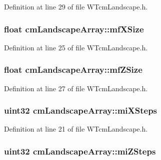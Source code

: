 Definition at line 29 of file WTcmLandscape.h.

\hypertarget{classcm_landscape_array_a207de95dc2e9c858f46d2b2eb974c084}{
\subsubsection[{mfXSize}]{\setlength{\rightskip}{0pt plus 5cm}float {\bf cmLandscapeArray::mfXSize}}}
\label{classcm_landscape_array_a207de95dc2e9c858f46d2b2eb974c084}


Definition at line 25 of file WTcmLandscape.h.

\hypertarget{classcm_landscape_array_a073dfe447fd51f39c73886b8f86cd997}{
\subsubsection[{mfZSize}]{\setlength{\rightskip}{0pt plus 5cm}float {\bf cmLandscapeArray::mfZSize}}}
\label{classcm_landscape_array_a073dfe447fd51f39c73886b8f86cd997}


Definition at line 27 of file WTcmLandscape.h.

\hypertarget{classcm_landscape_array_ac12e8c5ad15c0d58ef5ceed7781ff8a4}{
\subsubsection[{miXSteps}]{\setlength{\rightskip}{0pt plus 5cm}uint32 {\bf cmLandscapeArray::miXSteps}}}
\label{classcm_landscape_array_ac12e8c5ad15c0d58ef5ceed7781ff8a4}


Definition at line 21 of file WTcmLandscape.h.

\hypertarget{classcm_landscape_array_ad3fa0c26a0b1ad0e39f9038d963ede9b}{
\subsubsection[{miZSteps}]{\setlength{\rightskip}{0pt plus 5cm}uint32 {\bf cmLandscapeArray::miZSteps}}}
\label{classcm_landscape_array_ad3fa0c26a0b1ad0e39f9038d963ede9b}


